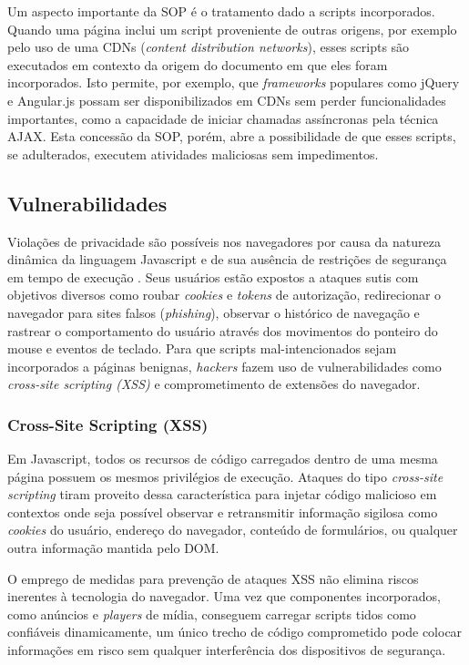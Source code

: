 Um aspecto importante da SOP é o tratamento dado a scripts incorporados. Quando uma página inclui um script proveniente de outras origens, por exemplo pelo uso de uma CDNs (\textit{content distribution networks}), esses scripts são executados em contexto da origem do documento em que eles foram incorporados. Isto permite, por exemplo, que \textit{frameworks} populares como jQuery e Angular.js possam ser disponibilizados em CDNs sem perder funcionalidades importantes, como a capacidade de iniciar chamadas assíncronas pela técnica AJAX. Esta concessão da SOP, porém, abre a possibilidade de que esses scripts, se adulterados, executem atividades maliciosas sem impedimentos.

\subsection{Vulnerabilidades}

Violações de privacidade são possíveis nos navegadores por causa da natureza dinâmica da linguagem Javascript e de sua ausência de restrições de segurança em tempo de execução \cite{Jang2010}. Seus usuários estão expostos a ataques sutis com objetivos diversos como roubar \textit{cookies} e \textit{tokens} de autorização, redirecionar o navegador para sites falsos (\textit{phishing}), observar o histórico de navegação e rastrear o comportamento do usuário através dos movimentos do ponteiro do mouse e eventos de teclado. Para que scripts mal-intencionados sejam incorporados a páginas benignas, \textit{hackers} fazem uso de vulnerabilidades como \textit{cross-site scripting (XSS)} \cite{OWASP:XSS} e comprometimento de extensões \cite{Heule2015_Most_Dangerous_Code} do navegador.

\subsubsection{Cross-Site Scripting (XSS)}
Em Javascript, todos os recursos de código carregados dentro de uma mesma página possuem os mesmos privilégios de execução. Ataques do tipo \textit{cross-site scripting} tiram proveito dessa característica para injetar código malicioso em contextos onde seja possível observar e retransmitir informação sigilosa como \textit{cookies} do usuário, endereço do navegador, conteúdo de formulários, ou qualquer outra informação mantida pelo DOM.

O emprego de medidas para prevenção de ataques XSS \cite{OWASP:XSS-CheatSheet} não elimina riscos inerentes à tecnologia do navegador. Uma vez que componentes incorporados, como anúncios e \textit{players} de mídia, conseguem carregar scripts tidos como confiáveis dinamicamente, um único trecho de código comprometido pode colocar informações em risco sem qualquer interferência dos dispositivos de segurança.

